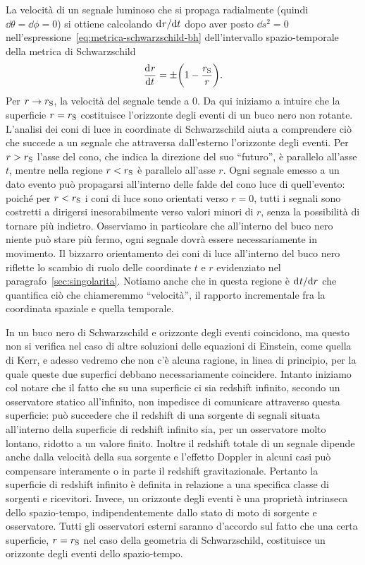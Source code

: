 La velocità di un segnale luminoso che si propaga radialmente (quindi
\(\dd\theta = \dd\phi = 0\)) si ottiene calcolando \(\mathrm{d}^{}r / \mathrm{d} {t}^{}\) dopo aver
posto \(\dd s^{2} = 0\) nell'espressione~\eqref{eq:metrica-schwarzschild-bh}
dell'intervallo spazio-temporale della metrica di Schwarzschild
\begin{equation}
  \frac{{\mathop{}\!\mathrm{d}^{}}r}{\mathop{}\!\mathrm{d} {t}^{}} = \pm \biggl(1 - \frac{r_{\textup{S}}}{r}\biggr).
\end{equation}
Per \(r \to r_{\textup{S}}\), la velocità del segnale tende a \(0\).  Da qui
iniziamo a intuire che la superficie \(r = r_{\textup{S}}\) costituisce
l'orizzonte degli eventi di un buco nero non rotante.  L'analisi dei coni di
luce in coordinate di Schwarzschild aiuta a comprendere ciò che succede a un
segnale che attraversa dall'esterno l'orizzonte degli eventi.  Per \(r >
r_{\textup{S}}\) l'asse del cono, che indica la direzione del suo ``futuro'', è
parallelo all'asse \(t\), mentre nella regione \(r < r_{\textup{S}}\) è
parallelo all'asse \(r\).  Ogni segnale emesso a un dato evento può propagarsi
all'interno delle falde del cono luce di quell'evento: poiché per \(r <
r_{\textup{S}}\) i coni di luce sono orientati verso \(r = 0\), tutti i segnali
sono costretti a dirigersi inesorabilmente verso valori minori di \(r\), senza
la possibilità di tornare più indietro.  Osserviamo in particolare che
all'interno del buco nero niente può stare più fermo, ogni segnale dovrà essere
necessariamente in movimento.  Il bizzarro orientamento dei coni di luce
all'interno del buco nero riflette lo scambio di ruolo delle coordinate \(t\) e
\(r\) evidenziato nel paragrafo~\ref{sec:singolarita}.  Notiamo anche che in
questa regione è \(\mathrm{d}^{}t / \mathrm{d} {r}^{}\) che quantifica ciò che chiameremmo
``velocità'', il rapporto incrementale fra la coordinata spaziale e quella
temporale.

In un buco nero di Schwarzschild e orizzonte degli eventi coincidono, ma questo
non si verifica nel caso di altre soluzioni delle equazioni di Einstein, come
quella di Kerr, e adesso vedremo che non c'è alcuna ragione, in linea di
principio, per la quale queste due superfici debbano necessariamente coincidere.
Intanto iniziamo col notare che il fatto che su una superficie ci sia redshift
infinito, secondo un osservatore statico all'infinito, non impedisce di
comunicare attraverso questa superficie: può succedere che il redshift di una
sorgente di segnali situata all'interno della superficie di redshift infinito
sia, per un osservatore molto lontano, ridotto a un valore finito.  Inoltre il
redshift totale di un segnale dipende anche dalla velocità della sua sorgente e
l'effetto Doppler in alcuni casi può compensare interamente o in parte il
redshift gravitazionale.  Pertanto la superficie di redshift infinito è definita
in relazione a una specifica classe di sorgenti e ricevitori.  Invece, un
orizzonte degli eventi è una proprietà intrinseca dello spazio-tempo,
indipendentemente dallo stato di moto di sorgente e osservatore.  Tutti gli
osservatori esterni saranno d'accordo sul fatto che una certa superficie, \(r =
r_{\textup{S}}\) nel caso della geometria di Schwarzschild, costituisce un
orizzonte degli eventi dello spazio-tempo.

